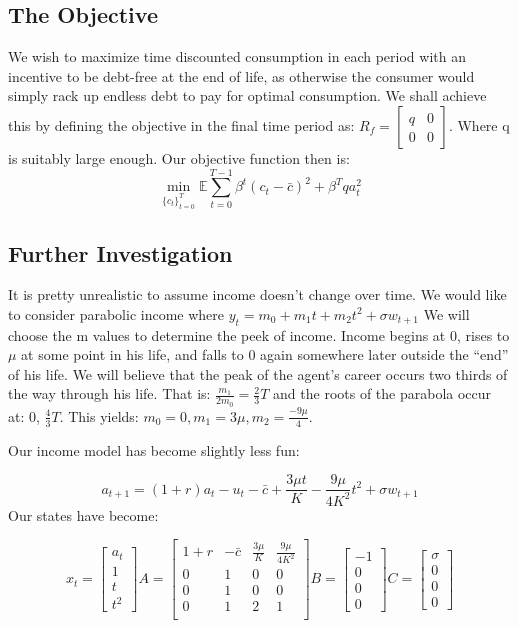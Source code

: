 \documentclass[10pt]{paper}
\begin{document}
\subsection*{The Objective}

We wish to maximize time discounted consumption in each period with an
incentive to be debt-free at the end of life, as otherwise the
consumer would simply rack up endless debt to pay for optimal
consumption. We shall achieve this by defining the objective in the
final time period as: $R_f = \begin{bmatrix} q & 0\\ 0 &
  0 \end{bmatrix}$. Where q is suitably large enough. Our objective
function then is:
$$\min_{{\{c_t\}}_{t=0}^T}\mathbb{E} \sum_{t=0}^{T-1}\beta^t(c_t - \bar{c})^2
+ \beta^T q a_t^2$$


\subsection*{Further Investigation}
It is pretty unrealistic to assume income
doesn't change over time. We would like to consider parabolic income
where $y_t = m_0 + m_1t + m_2t^2 + \sigma w_{t+1}$ We will choose the m
values to determine the peek of income. Income begins at 0, rises to
$\mu$ at some point in his life, and falls to 0 again somewhere later
outside the ``end'' of his life. We will believe that the peak of the
agent's career occurs two thirds of the way through his life. That is:
$\frac{m_1}{2m_0} = \frac{2}{3}T$ and the roots of the parabola occur
at: 0, $\frac{4}{3}T$. This yields: $m_0 = 0, m_1 = 3\mu, m_2 =
\frac{-9\mu}{4}$.

Our income model has become slightly less fun:

$$a_{t+1} = (1+r)a_t - u_t - \bar{c} + \frac{3\mu t}{K} - \frac{9\mu}{4K^2}t^2 + \sigma
w_{t+1}$$
Our states have become:

$$x_t =
\begin{bmatrix}
  a_t\\1\\t\\t^2
\end{bmatrix}
A =
\begin{bmatrix}
  1+r & -\bar{c} & \frac{3 \mu}{K} & \frac{9\mu}{4K^2}\\
  0 & 1 & 0 & 0\\
  0 & 1 & 0 & 0\\
  0 & 1 & 2 & 1\\
\end{bmatrix}
 B =
 \begin{bmatrix}
   -1\\0\\0\\0
 \end{bmatrix}
C =
\begin{bmatrix}
  \sigma\\0\\0\\0
\end{bmatrix}
$$
\end{document}
